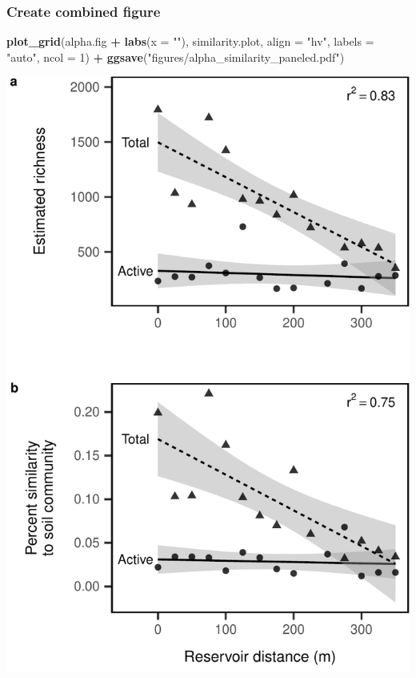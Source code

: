 \documentclass[]{article}
\newenvironment{Shaded}{\begin{snugshade}}{\end{snugshade}}
\newcommand{\DataTypeTok}[1]{\textcolor[rgb]{0.13,0.29,0.53}{#1}}
\newcommand{\DecValTok}[1]{\textcolor[rgb]{0.00,0.00,0.81}{#1}}
\newcommand{\KeywordTok}[1]{\textcolor[rgb]{0.13,0.29,0.53}{\textbf{#1}}}
\newcommand{\NormalTok}[1]{#1}
\newcommand{\OperatorTok}[1]{\textcolor[rgb]{0.81,0.36,0.00}{\textbf{#1}}}
\newcommand{\StringTok}[1]{\textcolor[rgb]{0.31,0.60,0.02}{#1}}
\begin{document}
\hypertarget{create-combined-figure}{%
\subsubsection{Create combined figure}\label{create-combined-figure}}

\begin{Shaded}
\begin{Highlighting}[]
\KeywordTok{plot_grid}\NormalTok{(alpha.fig }\OperatorTok{+}\StringTok{ }\KeywordTok{labs}\NormalTok{(}\DataTypeTok{x =} \StringTok{""}\NormalTok{), similarity.plot, }
          \DataTypeTok{align =} \StringTok{"hv"}\NormalTok{,}
          \DataTypeTok{labels =} \StringTok{"auto"}\NormalTok{, }\DataTypeTok{ncol =} \DecValTok{1}\NormalTok{) }\OperatorTok{+}
\StringTok{  }\KeywordTok{ggsave}\NormalTok{(}\StringTok{"figures/alpha_similarity_paneled.pdf"}\NormalTok{)}
\end{Highlighting}
\end{Shaded}

\begin{center}\includegraphics{ReservoirGradient_files/figure-latex/combined-plots-1} \end{center}
\end{document}
